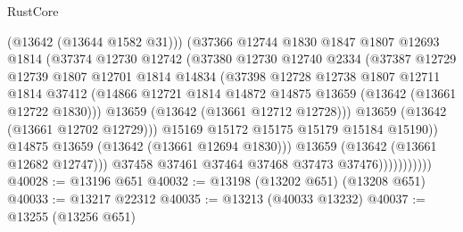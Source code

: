 \begin{lexlean}{RustCore}
\begin{coremodule}
                              (@13642 (@13644 @1582 @31)))
                            (@37366
                              @12744
                              @1830
                              @1847
                              @1807
                              @12693
                              @1814
                              (@37374
                                @12730
                                @12742
                                (@37380
                                  @12730
                                  @12740
                                  @2334
                                  (@37387
                                    @12729
                                    @12739
                                    @1807
                                    @12701
                                    @1814
                                    @14834
                                    (@37398
                                      @12728
                                      @12738
                                      @1807
                                      @12711
                                      @1814
                                      @37412
                                      (@14866
                                        @12721
                                        @1814
                                        @14872
                                        @14875
                                        @13659
                                        (@13642 (@13661 @12722 @1830)))
                                      @13659
                                      (@13642 (@13661 @12712 @12728)))
                                    @13659
                                    (@13642 (@13661 @12702 @12729)))
                                  @15169
                                  @15172
                                  @15175
                                  @15179
                                  @15184
                                  @15190))
                              @14875
                              @13659
                              (@13642 (@13661 @12694 @1830)))
                            @13659
                            (@13642 (@13661 @12682 @12747)))
                          @37458
                          @37461
                          @37464
                          @37468
                          @37473
                          @37476)))))))))))
@40028 := @13196 @651
@40032 := @13198 (@13202 @651) (@13208 @651)
@40033 := @13217 @22312
@40035 := @13213 (@40033 @13232)
@40037 := @13255 (@13256 @651)

\end{coremodule}
\end{lexlean}
